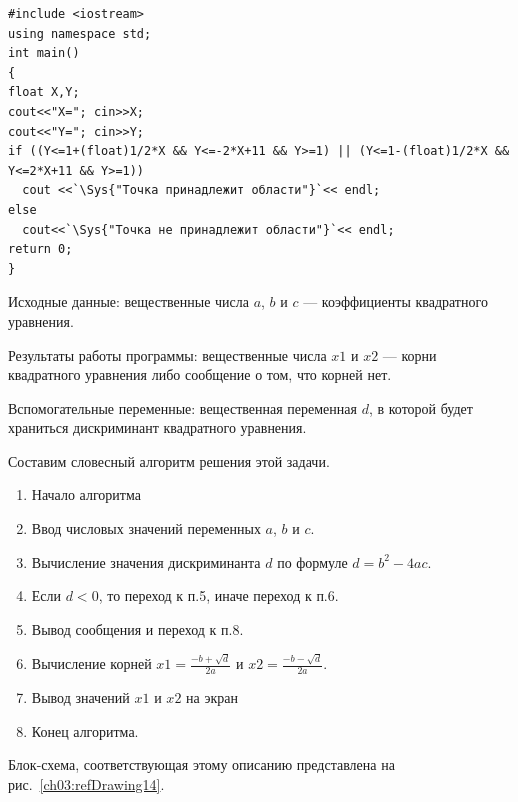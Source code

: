 \begin{lstlisting}
#include <iostream>
using namespace std;
int main()
{
float X,Y;
cout<<"X="; cin>>X;
cout<<"Y="; cin>>Y;
if ((Y<=1+(float)1/2*X && Y<=-2*X+11 && Y>=1) || (Y<=1-(float)1/2*X && Y<=2*X+11 && Y>=1))
  cout <<`\Sys{"Точка принадлежит области"}`<< endl;
else
  cout<<`\Sys{"Точка не принадлежит области"}`<< endl;
return 0;
}
\end{lstlisting}


Исходные данные: вещественные числа $a$, $b$ и $c$ --- коэффициенты
квадратного уравнения.

Результаты работы программы: вещественные числа $x1$ и $x2$ --- корни квадратного
уравнения либо сообщение о том, что корней нет.

Вспомогательные переменные: вещественная переменная $d$, в которой будет храниться дискриминант
квадратного уравнения.

Составим словесный алгоритм решения этой задачи.
\begin{enumerate}
\item Начало алгоритма
\item Ввод числовых значений переменных $a$, $b$ и $c$.
\item Вычисление значения дискриминанта $d$ по формуле  $d=b^2-4ac$.
\item Если $d<0$, то переход к п.5, иначе переход к п.6.
\item Вывод сообщения  и переход к п.8.
\item Вычисление корней  $x1=\frac{-b+\sqrt{d}}{2a}$  и  $x2=\frac{-b-\sqrt{d}}{2a}$.
\item Вывод значений $x1$ и $x2$ на экран
\item Конец алгоритма.
\end{enumerate}
Блок-схема, соответствующая этому описанию представлена на рис.~\ref{ch03:refDrawing14}.

